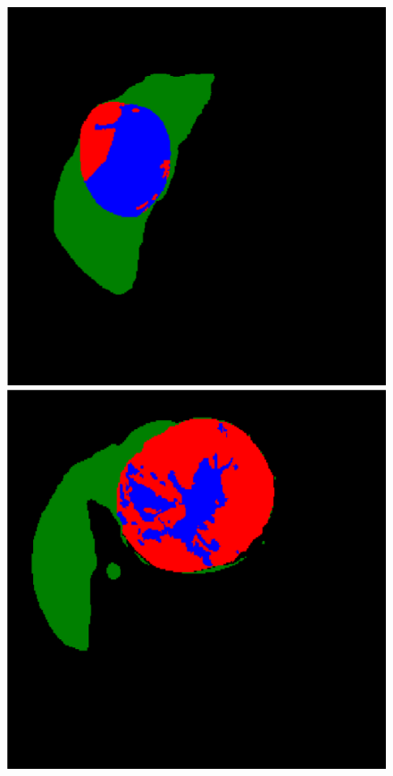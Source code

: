 \begin{figure}[!ht]
\begin{minipage}{4cm}
\end{minipage}
\vspace{-0.2cm}
\begin{minipage}{4cm}
\includegraphics*[width=\linewidth]{./images/1_7_gt_new_resized}
\end{minipage} \hspace{-0.3cm}
\begin{minipage}{4cm}
\includegraphics*[width=\linewidth]{./images/2_3gt_resized}

\end{minipage}
\end{figure}
